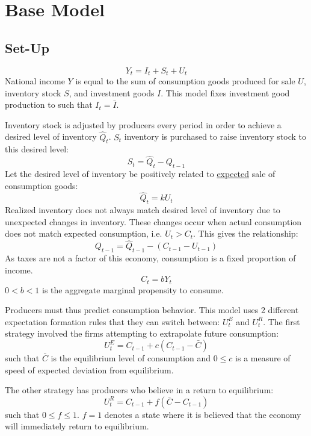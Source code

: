 \documentclass[]{article}
\begin{document}
\section{Base Model}
\subsection*{Set-Up}
\begin{equation*}
    Y_t=I_t+S_t+U_t
\end{equation*}
National income $Y$ is equal to the sum of consumption goods produced for sale $U$, inventory stock $S$, and investment goods $I$. This model fixes investment good production to such that $I_t=\bar I$.

Inventory stock is adjusted by producers every period in order to achieve a desired level of inventory $\hat Q_t$. $S_t$ inventory is purchased to raise inventory stock to this desired level:
\begin{equation*}
    S_t=\hat Q_t-Q_{t-1}
\end{equation*}
Let the desired level of inventory be positively related to \underline{expected} sale of consumption goods:
\begin{equation*}
	\hat Q_t=k U_t
\end{equation*}
Realized inventory does not always match desired level of inventory due to unexpected changes in inventory. These changes occur when actual consumption does not match expected consumption, i.e. $U_t>C_t$. This gives the relationship:
\begin{equation*}
	Q_{t-1}=\hat Q_{t-1}-(C_{t-1}-U_{t-1})
\end{equation*}
As taxes are not a factor of this economy, consumption is a fixed proportion of income.
\begin{equation*}
	C_t=bY_t
\end{equation*}
$0<b<1$ is the aggregate marginal propensity to consume. 

Producers must thus predict consumption behavior. This model uses 2 different expectation formation rules that they can switch between: $U_t^E$ and $U_t^R$. The first strategy involved the firms attempting to extrapolate future consumption:
\begin{equation*}
	U_t^E=C_{t-1}+c(C_{t-1}-\bar C)
\end{equation*}
such that $\bar C$ is the equilibrium level of consumption and $0\leq c$ is a measure of speed of expected deviation from equilibrium.

The other strategy has producers who believe in a return to equilibrium:
\begin{equation*}
	U_t^R=C_{t-1}+f(\bar C-C_{t-1})
\end{equation*}
such that $0\leq f\leq 1$. $f=1$ denotes a state where it is believed that the economy will immediately return to equilibrium. 
\end{document}
